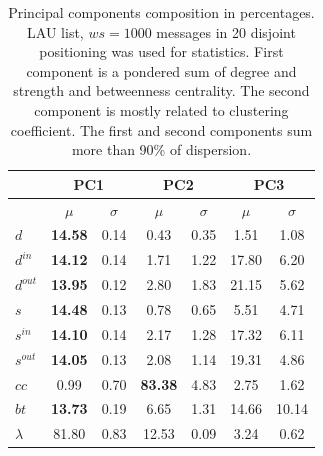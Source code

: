 \documentclass[%
 aip,
 jmp,%
 amsmath,amssymb,
 reprint,%
]{revtex4-1}
\begin{document}
\begin{table}
  \centering
  \caption{Principal components composition in percentages. LAU list, $ws=1000$ messages in 20 disjoint positioning was used for statistics. First component is a pondered sum of degree and strength and betweenness centrality. The second component is mostly related to clustering coefficient. The first and second components sum more than 90\% of dispersion.}
  \begin{tabular}{|l|c|c| c|c| c|c|}\hline
 & \multicolumn{2}{c|}{PC1} & \multicolumn{2}{c|}{PC2} & \multicolumn{2}{c|}{PC3}  \\\hline
       & $\mu$ & $\sigma$ & $\mu$ & $\sigma$ & $\mu$ & $\sigma$  \\\hline
$d$       & {\bf 14.58} & 0.14 & 0.43  & 0.35 & 1.51  & 1.08 \\
$d^{in}$  & {\bf 14.12} & 0.14 & 1.71  & 1.22 & 17.80 & 6.20 \\
$d^{out}$ & {\bf 13.95} & 0.12 & 2.80  & 1.83 & 21.15 & 5.62 \\
$s$       & {\bf 14.48} & 0.13 & 0.78  & 0.65 & 5.51  & 4.71 \\ 
$s^{in}$  & {\bf 14.10} & 0.14 & 2.17  & 1.28 & 17.32 & 6.11 \\ 
$s^{out}$ & {\bf 14.05} & 0.13 & 2.08  & 1.14 & 19.31 & 4.86 \\ \hline
$cc$      & 0.99        & 0.70 & {\bf 83.38} & 4.83 & 2.75  & 1.62 \\ 
$bt$      & {\bf 13.73} & 0.19 & 6.65  & 1.31 & 14.66 & 10.14 \\ \hline
$\lambda$ & 81.80 & 0.83 & 12.53 & 0.09  & 3.24 & 0.62 \\ \hline
  \end{tabular}
  \label{compPCA}
\end{table}
\end{document}
